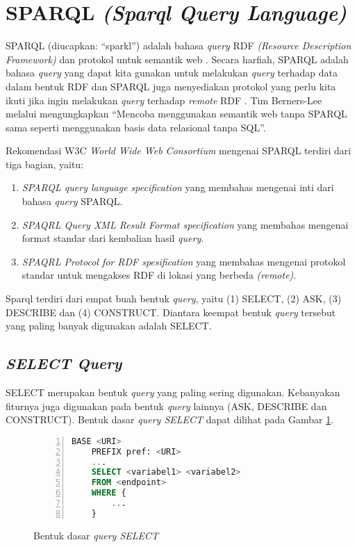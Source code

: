 \section{SPARQL \emph{(Sparql Query Language)}}
SPARQL (diucapkan: ``sparkl'') adalah bahasa \emph{query} RDF \emph{(Resource Description Framework)} dan protokol untuk semantik web \citep{liyang_yu}. Secara harfiah, SPARQL adalah bahasa \emph{query} yang dapat kita gunakan untuk melakukan \emph{query} terhadap data dalam bentuk RDF dan SPARQL juga menyediakan protokol yang perlu kita ikuti jika ingin melakukan \emph{query} terhadap \emph{remote} RDF \citep{liyang_yu}. Tim Berners-Lee melalui \citet{ducharme} mengungkapkan ``Mencoba menggunakan semantik web tanpa SPARQL sama seperti menggunakan basis data relasional tanpa SQL''.

Rekomendasi W3C \emph{World Wide Web Consortium} mengenai SPARQL terdiri dari tiga bagian, yaitu:

\begin{enumerate}
	\item \emph{SPARQL query language specification} yang membahas mengenai inti dari bahasa \emph{query} SPARQL.
	\item \emph{SPAQRL Query XML Result Format specification} yang membahas mengenai format standar dari kembalian hasil \emph{query}.
	\item \emph{SPAQRL Protocol for RDF spesification} yang membahas mengenai protokol standar untuk mengakses RDF di lokasi yang berbeda \emph{(remote)}.
\end{enumerate}

Sparql terdiri dari empat buah bentuk \emph{query}, yaitu (1) SELECT, (2) ASK, (3) DESCRIBE dan (4) CONSTRUCT. Diantara keempat bentuk \emph{query} tersebut yang paling banyak digunakan adalah SELECT.

\subsection{\emph{SELECT Query}}
SELECT merupakan bentuk \emph{query} yang paling sering digunakan. Kebanyakan fiturnya juga digunakan pada bentuk \emph{query} lainnya (ASK, DESCRIBE dan CONSTRUCT). Bentuk dasar \emph{query SELECT} dapat dilihat pada Gambar \ref{fig:bentuk_query_select}.
\begin{figure}[hb]
	\centering
	\begin{lstlisting}[language=SQL, xleftmargin=15pt, numbers=left]
 	BASE <URI>
 	PREFIX pref: <URI>
 	...
 	SELECT <variabel1> <variabel2>
 	FROM <endpoint>
 	WHERE {
 		...
 	}\end{lstlisting} 
	\caption{Bentuk dasar \emph{query SELECT} \citep{liyang_yu}}
	\label{fig:bentuk_query_select}
\end{figure}

